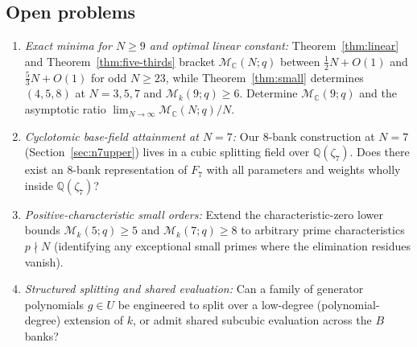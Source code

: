 \documentclass[11pt,reqno]{amsart}
\numberwithin{equation}{section}
\theoremstyle{definition}
\theoremstyle{remark}
\newcommand{\C}{\mathbb{C}}
\newcommand{\Q}{\mathbb{Q}}
\newcommand{\M}{\mathcal{M}}
\begin{document}
\subsection*{Open problems}
\begin{enumerate}[label=(\arabic*),leftmargin=2em]
\item \emph{Exact minima for $N\ge 9$ and optimal linear constant:} Theorem~\ref{thm:linear} and Theorem~\ref{thm:five-thirds} bracket $\M_{\C}(N;q)$ between $\frac{1}{2}N + O(1)$ and $\frac{5}{3}N + O(1)$ for odd $N\ge 23$, while Theorem~\ref{thm:small} determines $(4,5,8)$ at $N=3,5,7$ and $\M_k(9;q)\ge 6$. Determine $\M_{\C}(9;q)$ and the asymptotic ratio $\lim_{N\to\infty}\M_{\C}(N;q)/N$.
\item \emph{Cyclotomic base-field attainment at $N=7$:} Our $8$-bank construction at $N=7$ (Section~\ref{sec:n7upper}) lives in a cubic splitting field over $\Q(\zeta_7)$. Does there exist an $8$-bank representation of $F_7$ with all parameters and weights wholly inside $\Q(\zeta_7)$?
\item \emph{Positive-characteristic small orders:} Extend the characteristic-zero lower bounds $\M_k(5;q)\ge 5$ and $\M_k(7;q)\ge 8$ to arbitrary prime characteristics $p\nmid N$ (identifying any exceptional small primes where the elimination residues vanish).
\item \emph{Structured splitting and shared evaluation:} Can a family of generator polynomials $g\in U$ be engineered to split over a low-degree (polynomial-degree) extension of $k$, or admit shared subcubic evaluation across the $B$ banks?
\end{enumerate}
\end{document}
